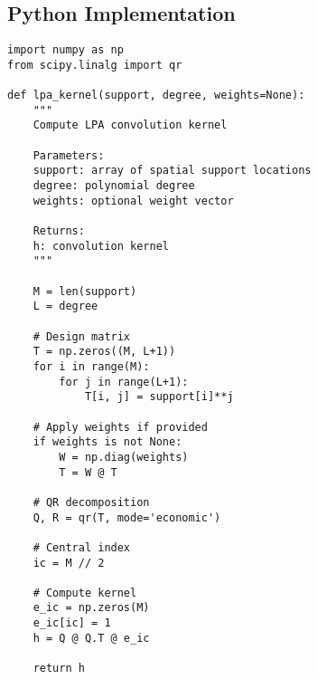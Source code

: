 \documentclass[12pt]{article}
\theoremstyle{definition}
\begin{document}
\subsection{Python Implementation}
\label{subsec:python_impl}

\begin{verbatim}
import numpy as np
from scipy.linalg import qr

def lpa_kernel(support, degree, weights=None):
    """
    Compute LPA convolution kernel
    
    Parameters:
    support: array of spatial support locations
    degree: polynomial degree
    weights: optional weight vector
    
    Returns:
    h: convolution kernel
    """
    
    M = len(support)
    L = degree
    
    # Design matrix
    T = np.zeros((M, L+1))
    for i in range(M):
        for j in range(L+1):
            T[i, j] = support[i]**j
    
    # Apply weights if provided
    if weights is not None:
        W = np.diag(weights)
        T = W @ T
    
    # QR decomposition
    Q, R = qr(T, mode='economic')
    
    # Central index
    ic = M // 2
    
    # Compute kernel
    e_ic = np.zeros(M)
    e_ic[ic] = 1
    h = Q @ Q.T @ e_ic
    
    return h
\end{verbatim}
\end{document}
